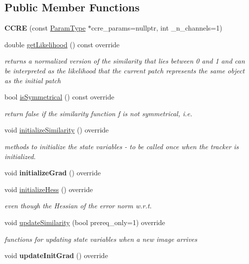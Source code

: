 \subsection*{Public Member Functions}
\begin{DoxyCompactItemize}
\item 
\hypertarget{classCCRE_adc57df943876cd0f20fc9d653d5b3acb}{{\bfseries C\-C\-R\-E} (const \hyperlink{structCCREParams}{Param\-Type} $\ast$ccre\-\_\-params=nullptr, int \-\_\-n\-\_\-channels=1)}\label{classCCRE_adc57df943876cd0f20fc9d653d5b3acb}

\item 
\hypertarget{classCCRE_a72851d2a7225768fac7e0f59e95cb99d}{double \hyperlink{classCCRE_a72851d2a7225768fac7e0f59e95cb99d}{get\-Likelihood} () const override}\label{classCCRE_a72851d2a7225768fac7e0f59e95cb99d}

\begin{DoxyCompactList}\small\item\em returns a normalized version of the similarity that lies between 0 and 1 and can be interpreted as the likelihood that the current patch represents the same object as the initial patch \end{DoxyCompactList}\item 
bool \hyperlink{classCCRE_a5ef4da8fc8c410bddaded394596169be}{is\-Symmetrical} () const override
\begin{DoxyCompactList}\small\item\em return false if the similarity function f is not symmetrical, i.\-e. \end{DoxyCompactList}\item 
void \hyperlink{classCCRE_aa108e906b98207bbb4b5eb86ca6f5bc8}{initialize\-Similarity} () override
\begin{DoxyCompactList}\small\item\em methods to initialize the state variables -\/ to be called once when the tracker is initialized. \end{DoxyCompactList}\item 
\hypertarget{classCCRE_a5d8901983d3383c05e0bc35de29a9656}{void {\bfseries initialize\-Grad} () override}\label{classCCRE_a5d8901983d3383c05e0bc35de29a9656}

\item 
void \hyperlink{classCCRE_ade5c18165416a3c179cadecab9df7712}{initialize\-Hess} () override
\begin{DoxyCompactList}\small\item\em even though the Hessian of the error norm w.\-r.\-t. \end{DoxyCompactList}\item 
void \hyperlink{classCCRE_a88f2514eb41b3a38278cca83c1b884dd}{update\-Similarity} (bool prereq\-\_\-only=1) override
\begin{DoxyCompactList}\small\item\em functions for updating state variables when a new image arrives \end{DoxyCompactList}\item 
\hypertarget{classCCRE_a52a2b20f5413ed69f5651eb2d8c88c21}{void {\bfseries update\-Init\-Grad} () override}\label{classCCRE_a52a2b20f5413ed69f5651eb2d8c88c21}


\end{DoxyCompactItemize}
